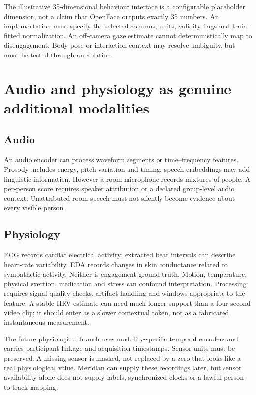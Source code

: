 \documentclass[10pt,a4paper]{article}
\begin{document}
The illustrative 35-dimensional behaviour interface is a configurable placeholder dimension, not a claim that OpenFace outputs exactly 35 numbers. An implementation must specify the selected columns, units, validity flags and train-fitted normalization. An off-camera gaze estimate cannot deterministically map to disengagement. Body pose or interaction context may resolve ambiguity, but must be tested through an ablation.

\section{Audio and physiology as genuine additional modalities}
\subsection{Audio}
An audio encoder can process waveform segments or time--frequency features. Prosody includes energy, pitch variation and timing; speech embeddings may add linguistic information. However a room microphone records mixtures of people. A per-person score requires speaker attribution or a declared group-level audio context. Unattributed room speech must not silently become evidence about every visible person.

\subsection{Physiology}
ECG records cardiac electrical activity; extracted beat intervals can describe heart-rate variability. EDA records changes in skin conductance related to sympathetic activity. Neither is engagement ground truth. Motion, temperature, physical exertion, medication and stress can confound interpretation. Processing requires signal-quality checks, artifact handling and windows appropriate to the feature. A stable HRV estimate can need much longer support than a four-second video clip; it should enter as a slower contextual token, not as a fabricated instantaneous measurement.

The future physiological branch uses modality-specific temporal encoders and carries participant linkage and acquisition timestamps. Sensor units must be preserved. A missing sensor is masked, not replaced by a zero that looks like a real physiological value. Meridian can supply these recordings later, but sensor availability alone does not supply labels, synchronized clocks or a lawful person-to-track mapping.
\end{document}
